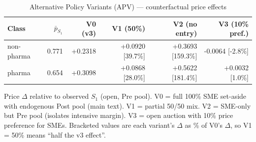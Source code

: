 \begin{table}[htbp]
\centering
\begin{threeparttable}
\caption{Alternative Policy Variants (APV) — counterfactual price effects}
\label{tab:v3_apv}
\small
\begin{tabular}{lrrrrr}
\toprule
Class & $\bar p_{S_1}$ & V0 (v3) & V1 (50\%) & V2 (no entry) & V3 (10\% pref.) \\
\midrule
non-pharma & 0.771 & +0.2318 & +0.0920 [39.7\%] & +0.3693 [159.3\%] & -0.0064 [-2.8\%] \\
pharma & 0.654 & +0.3098 & +0.0868 [28.0\%] & +0.5622 [181.4\%] & +0.0032 [1.0\%] \\
\bottomrule
\end{tabular}
\begin{tablenotes}\footnotesize
\item Price $\Delta$ relative to observed $S_1$ (open, Pre pool).
V0 = full 100\% SME set-aside with endogenous Post pool (main text).
V1 = partial 50/50 mix. V2 = SME-only but Pre pool (isolates intensive
margin). V3 = open auction with 10\% price preference for SMEs.
Bracketed values are each variant's $\Delta$ as \% of V0's $\Delta$,
so V1 = 50\% means ``half the v3 effect''.
\end{tablenotes}
\end{threeparttable}
\end{table}
